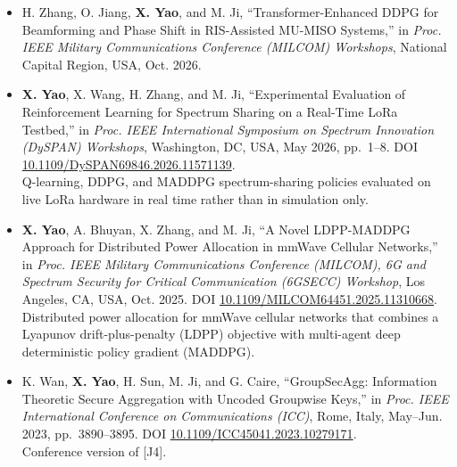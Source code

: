 \documentclass[10pt]{article}
\begin{document}
\begin{itemize}[leftmargin=3.9em,labelwidth=3.5em,labelsep=0.4em,align=left]
\item[{[C7]}] H. Zhang, O. Jiang, \textbf{X. Yao}, and M. Ji, ``Transformer-Enhanced DDPG for Beamforming and Phase Shift in RIS-Assisted MU-MISO Systems,'' in \emph{Proc. IEEE Military Communications Conference (MILCOM) Workshops}, National Capital Region, USA, Oct. 2026.
\item[{[C8]}] \textbf{X. Yao}, X. Wang, H. Zhang, and M. Ji, ``Experimental Evaluation of Reinforcement Learning for Spectrum Sharing on a Real-Time LoRa Testbed,'' in \emph{Proc. IEEE International Symposium on Spectrum Innovation (DySPAN) Workshops}, Washington, DC, USA, May 2026, pp.~1--8. DOI \href{https://doi.org/10.1109/DySPAN69846.2026.11571139}{10.1109/DySPAN69846.2026.11571139}.\\
{\small Q-learning, DDPG, and MADDPG spectrum-sharing policies evaluated on live LoRa hardware in real time rather than in simulation only.}
\item[{[C9]}] \textbf{X. Yao}, A. Bhuyan, X. Zhang, and M. Ji, ``A Novel LDPP-MADDPG Approach for Distributed Power Allocation in mmWave Cellular Networks,'' in \emph{Proc. IEEE Military Communications Conference (MILCOM), 6G and Spectrum Security for Critical Communication (6GSECC) Workshop}, Los Angeles, CA, USA, Oct. 2025. DOI \href{https://doi.org/10.1109/MILCOM64451.2025.11310668}{10.1109/MILCOM64451.2025.11310668}.\\
{\small Distributed power allocation for mmWave cellular networks that combines a Lyapunov drift-plus-penalty (LDPP) objective with multi-agent deep deterministic policy gradient (MADDPG).}
\item[{[C10]}] K. Wan, \textbf{X. Yao}, H. Sun, M. Ji, and G. Caire, ``GroupSecAgg: Information Theoretic Secure Aggregation with Uncoded Groupwise Keys,'' in \emph{Proc. IEEE International Conference on Communications (ICC)}, Rome, Italy, May--Jun. 2023, pp.~3890--3895. DOI \href{https://doi.org/10.1109/ICC45041.2023.10279171}{10.1109/ICC45041.2023.10279171}.\\
{\small Conference version of [J4].}
\end{itemize}
\end{document}
